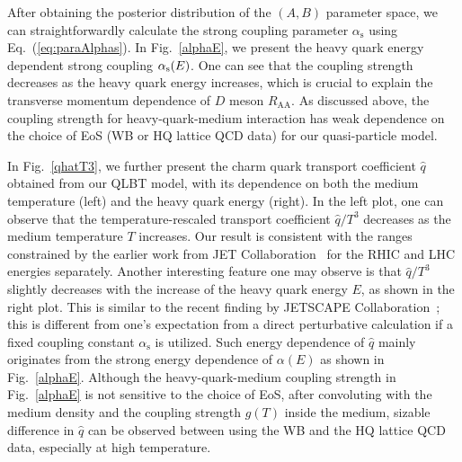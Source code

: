 \documentclass[aps,superscriptaddress,prc,twocolumn,nofootinbib]{revtex4}
\begin{document}
After obtaining the posterior distribution of the $(A, B)$ parameter space, we can straightforwardly calculate the strong coupling parameter $\alpha_\mathrm{s}$ using Eq.~(\ref{eq:paraAlphas}). In Fig.~\ref{alphaE}, we present the heavy quark energy dependent strong coupling $\alpha_{\rm s}(E)$. One can see that the coupling strength decreases as the heavy quark energy increases, which is crucial to explain the transverse momentum dependence of $D$ meson $R_\mathrm{AA}$. As discussed above, the coupling strength for heavy-quark-medium interaction has weak dependence on the choice of EoS (WB or HQ lattice QCD data) for our quasi-particle model.

In Fig.~\ref{qhatT3}, we further present the charm quark transport coefficient $\hat{q}$ obtained from our QLBT model, with its dependence on both the medium temperature (left) and the heavy quark energy (right). In the left plot, one can observe that the temperature-rescaled transport coefficient $\hat{q}/T^3$ decreases as the medium temperature $T$ increases. Our result is consistent with the ranges constrained by the earlier work from JET Collaboration~\cite{Burke:2013yra} for the RHIC and LHC energies separately. Another interesting feature one may observe is that $\hat{q}/T^3$ slightly decreases with the increase of the heavy quark energy $E$, as shown in the right plot. This is similar to the recent finding by JETSCAPE Collaboration~\cite{Cao:2021keo}; this is different from one's expectation from a direct perturbative calculation if a fixed coupling constant $\alpha_\mathrm{s}$ is utilized. Such energy dependence of $\hat{q}$ mainly originates from the strong energy dependence of $\alpha(E)$ as shown in Fig.~\ref{alphaE}. Although the heavy-quark-medium coupling strength in Fig.~\ref{alphaE} is not sensitive to the choice of EoS, after convoluting with the medium density and the coupling strength $g(T)$ inside the medium, sizable difference in $\hat{q}$ can be observed between using the WB and the HQ lattice QCD data, especially at high temperature.
\end{document}
